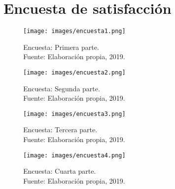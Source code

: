 \chapter{Encuesta de satisfacción}

\begin{figure}[!ht]
	\centering
	\captionsetup{justification=centering}
	\texttt{[image: images/encuesta1.png]}
	\caption[Encuesta: Primera parte.]{Encuesta: Primera parte.\\Fuente: Elaboración propia, 2019.}
	\label{fig:encuesta1}
\end{figure}

\begin{figure}[!ht]
	\centering
	\captionsetup{justification=centering}
	\texttt{[image: images/encuesta2.png]}
	\caption[Encuesta: Segunda parte.]{Encuesta: Segunda parte.\\Fuente: Elaboración propia, 2019.}
	\label{fig:encuesta2}
\end{figure}

\begin{figure}[!ht]
	\centering
	\captionsetup{justification=centering}
	\texttt{[image: images/encuesta3.png]}
	\caption[Encuesta: Tercera parte.]{Encuesta: Tercera parte.\\Fuente: Elaboración propia, 2019.}
	\label{fig:encuesta3}
\end{figure}

\begin{figure}[!ht]
	\centering
	\captionsetup{justification=centering}
	\texttt{[image: images/encuesta4.png]}
	\caption[Encuesta: Cuarta parte.]{Encuesta: Cuarta parte.\\Fuente: Elaboración propia, 2019.}
	\label{fig:encuesta4}
\end{figure}